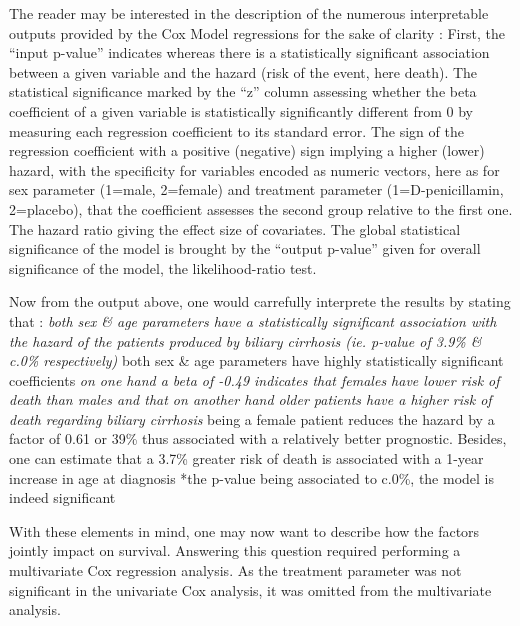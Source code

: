 \documentclass[]{article}
\begin{document}
The reader may be interested in the description of the numerous
interpretable outputs provided by the Cox Model regressions for the sake
of clarity : First, the ``input p-value'' indicates whereas there is a
statistically significant association between a given variable and the
hazard (risk of the event, here death). The statistical significance
marked by the ``z'' column assessing whether the beta coefficient of a
given variable is statistically significantly different from 0 by
measuring each regression coefficient to its standard error. The sign of
the regression coefficient with a positive (negative) sign implying a
higher (lower) hazard, with the specificity for variables encoded as
numeric vectors, here as for sex parameter (1=male, 2=female) and
treatment parameter (1=D-penicillamin, 2=placebo), that the coefficient
assesses the second group relative to the first one. The hazard ratio
giving the effect size of covariates. The global statistical
significance of the model is brought by the ``output p-value'' given for
overall significance of the model, the likelihood-ratio test.

Now from the output above, one would carrefully interprete the results
by stating that : \emph{both sex \& age parameters have a statistically
significant association with the hazard of the patients produced by
biliary cirrhosis (ie. p-value of 3.9\% \& c.0\% respectively) }both sex
\& age parameters have highly statistically significant coefficients
\emph{on one hand a beta of -0.49 indicates that females have lower risk
of death than males and that on another hand older patients have a
higher risk of death regarding biliary cirrhosis }being a female patient
reduces the hazard by a factor of 0.61 or 39\% thus associated with a
relatively better prognostic. Besides, one can estimate that a 3.7\%
greater risk of death is associated with a 1-year increase in age at
diagnosis *the p-value being associated to c.0\%, the model is indeed
significant

With these elements in mind, one may now want to describe how the
factors jointly impact on survival. Answering this question required
performing a multivariate Cox regression analysis. As the treatment
parameter was not significant in the univariate Cox analysis, it was
omitted from the multivariate analysis.
\end{document}
